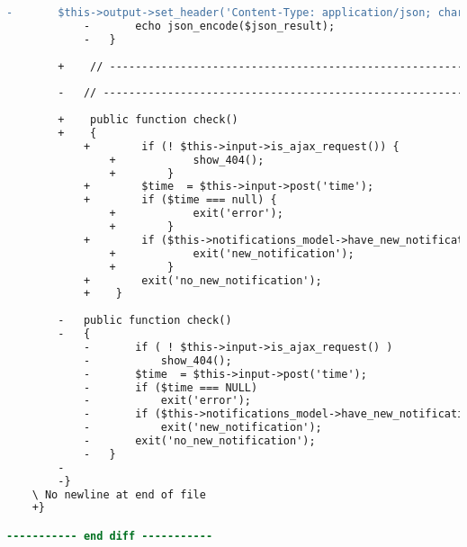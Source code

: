 \begin{lstlisting}[language=diff, caption=Perubahan pada kode Notifications.php]
			-		$this->output->set_header('Content-Type: application/json; charset=utf-8');
			-		echo json_encode($json_result);
			-	}
		
		+    // ------------------------------------------------------------------------
		
		-	// ------------------------------------------------------------------------
		
		+    public function check()
		+    {
			+        if (! $this->input->is_ajax_request()) {
				+            show_404();
				+        }
			+        $time  = $this->input->post('time');
			+        if ($time === null) {
				+            exit('error');
				+        }
			+        if ($this->notifications_model->have_new_notification(strtotime($time))) {
				+            exit('new_notification');
				+        }
			+        exit('no_new_notification');
			+    }
		
		-	public function check()
		-	{
			-		if ( ! $this->input->is_ajax_request() )
			-			show_404();
			-		$time  = $this->input->post('time');
			-		if ($time === NULL)
			-			exit('error');
			-		if ($this->notifications_model->have_new_notification(strtotime($time)))
			-			exit('new_notification');
			-		exit('no_new_notification');
			-	}
		-
		-}
	\ No newline at end of file
	+}

----------- end diff -----------
\end{lstlisting}

